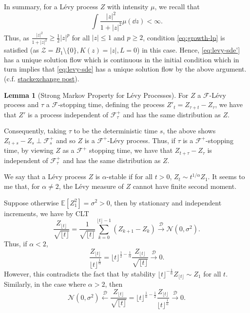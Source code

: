 \documentclass[]{article}
\theoremstyle{definition}
\theoremstyle{definition}
\newtheorem*{lemma*}{Lemma}
\begin{document}
In summary, for a L\'evy process \(Z\) with intensity \(\mu\), we recall that 
\[\int \frac{|z|^2}{1 + |z|^2} \mu(\dd z) < \infty.\]
Thus, as \(\frac{|z|^2}{1 + |z|^2} \ge \frac{1}{2}|z|^p\) for all \(|z| \le 1\) and \(p \ge 2\), 
condition \eqref{eq:growth-lp} is satisfied (as \(\mathcal{Z} = B_1\setminus\{0\}, K(z) = |z|, L = 0\)) in this case. 
Hence, \eqref{eq:levy-sde'} has a unique solution flow which is continuous in the initial condition 
which in turn implies that \eqref{eq:levy-sde} has a unique solution flow by the above argument.
(c.f. \href{https://math.stackexchange.com/questions/1878668/if-x-is-a-l%c3%a9vy-process-w-r-t-the-natural-filtration-mathcalf-is-it-so-w?rq=1}{stackexchange post}).

\begin{lemma*}[Strong Markov Property for L\'evy Processes]
  For \(Z\) a \(\mathcal{F}\)-L\'evy process and \(\tau\) a \(\mathcal{F}\)-stopping time, defining 
  the process \(Z'_t = Z_{\tau + t} - Z_\tau\), we have that \(Z'\) is a process independent of 
  \(\mathcal{F}_\tau^+\) and has the same distribution as \(Z\). 
\end{lemma*}

Consequently, taking \(\tau\) to be the deterministic time \(s\), the above shows \(Z_{t + s} - Z_{s} \perp \mathcal{F}_s^+\) 
and so \(Z\) is a \(\mathcal{F}^+\)-L\'evy process. Thus, if \(\tau\) is a \(\mathcal{F}^+\)-stopping time, 
by viewing \(Z\) as a \(\mathcal{F}^+\) stopping time, we have that \(Z_{t + \tau} - Z_{\tau}\) is independent
of \(\mathcal{F}_\tau^+\) and has the same distribution as \(Z\).

We say that a L\'evy process \(Z\) is \(\alpha\)-stable if for all \(t > 0\), \(Z_t \sim t^{1/\alpha}Z_1\). 
It seems to me that, for \(\alpha \neq 2\), the L\'evy measure of \(Z\) cannot have finite second moment. 

Suppose otherwise \(\mathbb{E}[Z_1^2] = \sigma^2 > 0\), then by stationary and independent increments, we have by CLT 
\[\frac{Z_{\lfloor t\rfloor}}{\sqrt{\lfloor t\rfloor}} = 
  \frac{1}{\sqrt{\lfloor t\rfloor}} \sum_{k = 0}^{\lfloor t\rfloor - 1} (Z_{k + 1} - Z_k) 
  \xrightarrow{\mathcal{D}} \mathcal{N}(0, \sigma^2).\]
Thus, if \(\alpha < 2\),
\[\frac{Z_{\lfloor t\rfloor}}{{\lfloor t\rfloor}^{\frac{1}{\alpha}}} =
  \lfloor t\rfloor^{\frac{1}{2} - \frac{1}{\alpha}}\frac{Z_{\lfloor t\rfloor}}{\sqrt{\lfloor t\rfloor}} 
  \xrightarrow{\mathcal{D}} 0.\]
However, this contradicts the fact that by stability \(\lfloor t\rfloor^{-\frac{1}{\alpha}}Z_{\lfloor t\rfloor} \sim Z_1\)
for all \(t\). Similarly, in the case where \(\alpha > 2\), then 
\[\mathcal{N}(0, \sigma^2) \xleftarrow{\mathcal{D}} \frac{Z_{\lfloor t\rfloor}}{\sqrt{\lfloor t\rfloor}} 
 = \lfloor t\rfloor^{\frac{1}{\alpha} - \frac{1}{2}}\frac{Z_{\lfloor t\rfloor}}{{\lfloor t\rfloor}^{\frac{1}{\alpha}}}
 \xrightarrow{\mathcal{D}} 0.\]
\end{document}
